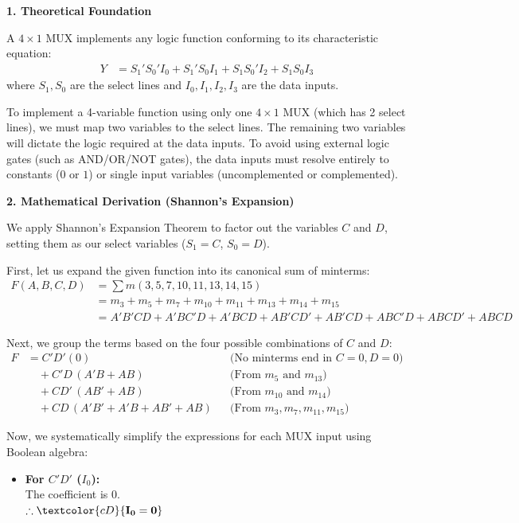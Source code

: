 \documentclass[12pt,a3paper]{article}
\begin{document}
\begin{enumerate}
\begin{tcolorbox}[enhanced,breakable,ansbox,colback=cD!4,colframe=cD,boxrule=0.8pt,arc=5pt,title={\textbf{Answer}},fonttitle=\bfseries\color{white},colbacktitle=cD]
\vspace{1em}
\textbf{\large 1. Theoretical Foundation}

A $4 \times 1$ MUX implements any logic function conforming to its characteristic equation:
\begin{align*}
    Y &= S_1'S_0' I_0 + S_1'S_0 I_1 + S_1S_0' I_2 + S_1S_0 I_3
\end{align*}
where $S_1, S_0$ are the select lines and $I_0, I_1, I_2, I_3$ are the data inputs. 

To implement a 4-variable function using only one $4 \times 1$ MUX (which has 2 select lines), we must map two variables to the select lines. The remaining two variables will dictate the logic required at the data inputs. To avoid using external logic gates (such as AND/OR/NOT gates), the data inputs must resolve entirely to constants ($0$ or $1$) or single input variables (uncomplemented or complemented). 

\vspace{1em}
\textbf{\large 2. Mathematical Derivation (Shannon's Expansion)}

We apply Shannon's Expansion Theorem to factor out the variables $C$ and $D$, setting them as our select variables ($S_1 = C$, $S_0 = D$). 

First, let us expand the given function into its canonical sum of minterms:
\begin{align*}
F(A,B,C,D) &= \sum m(3,5,7,10,11,13,14,15) \\
&= m_3 + m_5 + m_7 + m_{10} + m_{11} + m_{13} + m_{14} + m_{15} \\
&= A'B'CD + A'BC'D + A'BCD + AB'CD' + AB'CD + ABC'D + ABCD' + ABCD
\end{align*}

Next, we group the terms based on the four possible combinations of $C$ and $D$:
\begin{align*}
F &= C'D'(0) && \text{(No minterms end in $C=0, D=0$)} \\
  &\quad + C'D\,(A'B + AB) && \text{(From $m_5$ and $m_{13}$)} \\
  &\quad + CD'\,(AB' + AB) && \text{(From $m_{10}$ and $m_{14}$)} \\
  &\quad + CD\,(A'B' + A'B + AB' + AB) && \text{(From $m_3, m_7, m_{11}, m_{15}$)}
\end{align*}

Now, we systematically simplify the expressions for each MUX input using Boolean algebra:

\begin{itemize}
    \item \textbf{For $C'D'$ ($I_0$):} \\
    The coefficient is $0$. \\
    $\therefore \textcolor{cD}{\mathbf{I_0 = 0}}$


\end{itemize}
\end{tcolorbox}
\end{enumerate}
\end{document}
